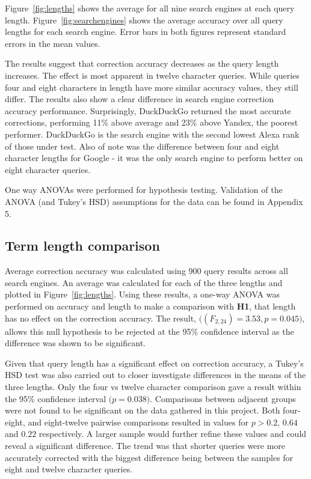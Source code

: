 \documentclass{csfourzero}
\begin{document}
Figure~\ref{fig:lengths} shows the average for all nine search engines at each query length. Figure~\ref{fig:searchengines} shows the average accuracy over all query lengths for each search engine. Error bars in both figures represent standard errors in the mean values.

The results suggest that correction accuracy decreases as the query length increases. The effect is most apparent in twelve character queries. While queries four and eight characters in length have more similar accuracy values, they still differ. The results also show a clear difference in search engine correction accuracy performance. Surprisingly, DuckDuckGo returned the most accurate corrections, performing 11\% above average and 23\% above Yandex, the poorest performer. DuckDuckGo is the search engine with the second lowest Alexa rank of those under test. Also of note was the difference between four and eight character lengths for Google - it was the only search engine to perform better on eight character queries.

One way ANOVAs were performed for hypothesis testing. Validation of the ANOVA (and Tukey's HSD) assumptions for the data can be found in Appendix 5.

\subsection{Term length comparison}
Average correction accuracy was calculated using 900 query results across all search engines. An average was calculated for each of the three lengths and plotted in Figure~\ref{fig:lengths}. Using these results, a one-way ANOVA was performed on accuracy and length to make a comparison with \textbf{H1}, that length has no effect on the correction accuracy. The result, $\big((F_{2,24}) = 3.53, p = 0.045\big)$, allows this null hypothesis to be rejected at the 95\% confidence interval as the difference was shown to be significant.

Given that query length has a significant effect on correction accuracy, a Tukey's HSD test was also carried out to closer investigate differences in the means of the three lengths. Only the four vs twelve character comparison gave a result within the 95\% confidence interval $\big(p = 0.038\big)$. Comparisons between adjacent groups were not found to be significant on the data gathered in this project. Both four-eight, and eight-twelve pairwise comparisons resulted in values for $p > 0.2$, $0.64$ and $0.22$ respectively. A larger sample would further refine these values and could reveal a significant difference. The trend was that shorter queries were more accurately corrected with the biggest difference being between the samples for eight and twelve character queries.
\end{document}
